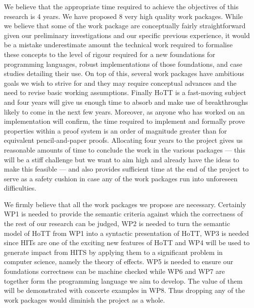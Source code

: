 \documentclass[a4paper,11pt]{article}
\begin{document}

\vspace{0.02in}

 We believe that the appropriate
time required to achieve the objectives of this research is 4
years. We have proposed 8 very high quality work packages. While we
believe that some of the work package are conceptually fairly
straightforward given our preliminary investigations and our specific
previous experience, it would be a mistake underestimate amount the
technical work required to formalise these concepts to the level of
rigour required for a new foundations for programming languages,
robust implementations of those foundations, and case studies
detailing their use. On top of this, several work packages have
ambitious goals we wish to strive for and they may require conceptual
advances and the need to revise basic working assumptions. Finally
HoTT is a fast-moving subject and four years will give us enough time
to absorb and make use of breakthroughs likely to come in the next few
years. Moreover, as anyone who has worked on an implementation will
confirm, the time required to implement and formally prove properties
within a proof system is an order of magnitude greater than for
equivalent pencil-and-paper proofs. Allocating four years to the
project gives us reasonable amounts of time to conclude the work in
the various packages --- this will be a stiff challenge but we want to
aim high and already have the ideas to make this feasible --- and also
provides sufficient time at the end of the project to serve as a
safety cushion in case any of the work packages run into unforeseen
difficulties.

We firmly believe that all the work packages we propose are
necessary. Certainly WP1 is needed to provide the semantic criteria
against which the correctness of the rest of our research can be
judged, WP2 is needed to turn the semantic model of HoTT from WP1 into
a syntactic presentation of HoTT, WP3 is needed since HITs are one of
the exciting new features of HoTT and WP4 will be used to generate
impact from HITS by applying them to a significant problem in computer
science, namely the theory of effects. WP5 is needed to ensure our
foundations correctness can be machine checked while WP6 and WP7 are
together form the programming language we aim to develop. The value of
them will be demonstrated with concerte examples in WP8.
Thus dropping any of the work packages would diminish the project as a whole.
\end{document}
